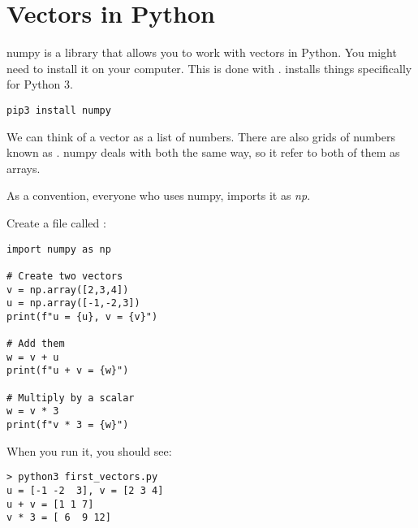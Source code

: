 \section{Vectors in Python}

numpy is a library that allows you to work with vectors in Python.  
You might need to install it on your computer. This is done with . 
 installs things specifically for Python 3.

\begin{Verbatim}
pip3 install numpy
\end{Verbatim}

We can think of a vector as a list of numbers.  
There are also grids of numbers known as . numpy deals with both the same way, 
so it refer to both of them as arrays.

As a convention, everyone who uses numpy, imports it as \textit{np}. 

Create a file called :

\begin{Verbatim}
import numpy as np

# Create two vectors
v = np.array([2,3,4])
u = np.array([-1,-2,3])
print(f"u = {u}, v = {v}")

# Add them
w = v + u
print(f"u + v = {w}")

# Multiply by a scalar
w = v * 3
print(f"v * 3 = {w}")
\end{Verbatim}

When you run it, you should see:

\begin{Verbatim}
> python3 first_vectors.py
u = [-1 -2  3], v = [2 3 4]
u + v = [1 1 7]
v * 3 = [ 6  9 12]
\end{Verbatim}